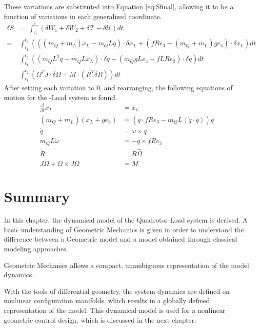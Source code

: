These variations are substituted into Equation \ref{eq:Sfinal}, allowing it to be a function of variations in each generalized coordinate.
\begin{equation}\label{eq:Sfinalfilled}
\begin{aligned}
\delta S &= \int_{t_1}^{t_2}(\delta W_1+\delta W_2+\delta\mathcal{T}-\delta\mathcal{U})dt\\
=&\int_{t_1}^{t_2}(((m_Q+m_L)\dot{x}_L-m_QL\dot{q})\cdot\delta\dot{x}_L+(fRe_3-(m_Q+m_L)ge_3)\cdot\delta x_L)dt\\
&\int_{t_1}^{t_2}((m_QL^2\dot{q}-m_QL\dot{x}_L)\cdot\delta\dot{q}+(m_QgLe_3-fLRe_3)\cdot\delta q)dt\\
&\int_{t_1}^{t_2}(\Omega^TJ \cdot \delta\Omega+M\cdot(R^T\delta R))dt
\end{aligned}
\end{equation}
After setting each variation to 0, and rearranging, the following equations of motion for the -Load system is found.
\begin{equation}\label{eq:mod.eom}
\begin{aligned}
\frac{d}{dt} x_L &=\dot{x}_L\\
(m_Q+m_L)(\ddot{x}_L+ge_3)&=(q\cdot fRe_3-m_QL(\dot{q}\cdot\dot{q}))q\\
\dot{q}&=\omega\times q\\
m_QL\dot{\omega}&=-q\times fRe_3\\
\dot{R}&=R\hat{\Omega}\\
J\dot{\Omega}+\Omega\times J\Omega&= M
\end{aligned}
\end{equation}

\section*{Summary}
In this chapter, the dynamical model of the Quadrotor-Load system is derived.
A basic understanding of Geometric Mechanics is given in order to understand the difference between a Geometric model and a model obtained through classical modeling approaches.

Geometric Mechanics allows a compact, unambiguous representation of the model dynamics.

With the tools of differential geometry, the system dynamics are defined on nonlinear configuration manifolds, which results in a globally defined representation of the model. This dynamical model is used for a nonlinear geometric control design, which is discussed in the next chapter.
